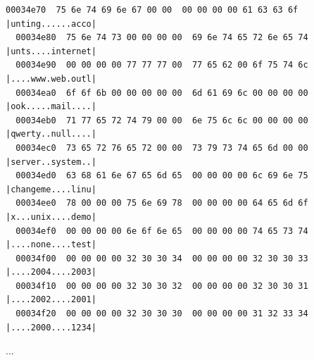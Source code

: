 \documentclass[]{project_plan}
\begin{document}
\begin{lstlisting}[basicstyle=\tiny]
  00034e70  75 6e 74 69 6e 67 00 00  00 00 00 00 61 63 63 6f  |unting......acco|
  00034e80  75 6e 74 73 00 00 00 00  69 6e 74 65 72 6e 65 74  |unts....internet|
  00034e90  00 00 00 00 77 77 77 00  77 65 62 00 6f 75 74 6c  |....www.web.outl|
  00034ea0  6f 6f 6b 00 00 00 00 00  6d 61 69 6c 00 00 00 00  |ook.....mail....|
  00034eb0  71 77 65 72 74 79 00 00  6e 75 6c 6c 00 00 00 00  |qwerty..null....|
  00034ec0  73 65 72 76 65 72 00 00  73 79 73 74 65 6d 00 00  |server..system..|
  00034ed0  63 68 61 6e 67 65 6d 65  00 00 00 00 6c 69 6e 75  |changeme....linu|
  00034ee0  78 00 00 00 75 6e 69 78  00 00 00 00 64 65 6d 6f  |x...unix....demo|
  00034ef0  00 00 00 00 6e 6f 6e 65  00 00 00 00 74 65 73 74  |....none....test|
  00034f00  00 00 00 00 32 30 30 34  00 00 00 00 32 30 30 33  |....2004....2003|
  00034f10  00 00 00 00 32 30 30 32  00 00 00 00 32 30 30 31  |....2002....2001|
  00034f20  00 00 00 00 32 30 30 30  00 00 00 00 31 32 33 34  |....2000....1234|
\end{lstlisting}
...
\end{document}
